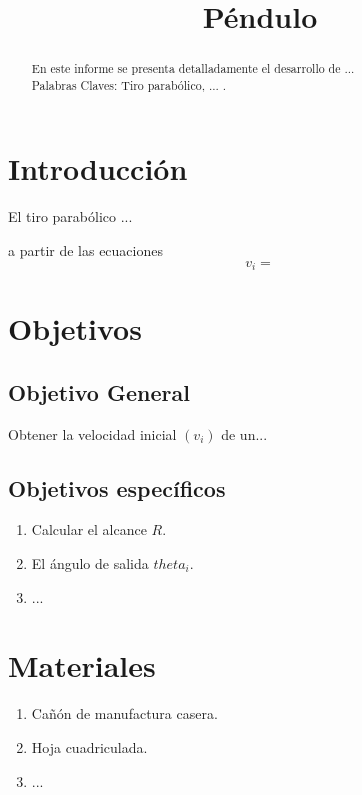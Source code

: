 \documentclass[journal]{IEEEtran}
\title{Péndulo}
\author{
\authorblockA{Nombre 1 \\Nombre 2 \\...\\ Docente: ... \\ 
\today  }}
\begin{document}
\maketitle

\begin{abstract}
En este informe se presenta detalladamente el desarrollo de ...\\

Palabras Claves: Tiro parabólico, ... .
\end{abstract}


\section{Introducción}
 El tiro parabólico ...

 a partir de las ecuaciones 
$$v_i=$$
 


\section{Objetivos}

\subsection{Objetivo General}
Obtener la velocidad inicial $(v_i)$ de un...

\subsection{Objetivos específicos}

\begin{enumerate}
    \item Calcular el alcance $R$. 
    \item El ángulo de salida $theta_i$.
    \item ...
\end{enumerate}


\section{Materiales}

\begin{enumerate}
    \item Cañón de manufactura casera.
    \item Hoja cuadriculada.
    \item ...
\end{enumerate}
\end{document}
